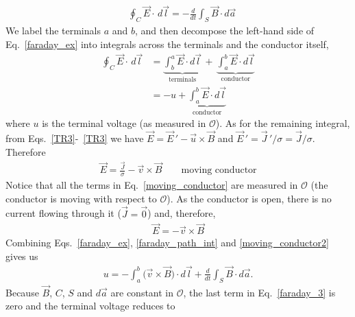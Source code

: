 \documentclass[11pt,a4paper,oneside]{book}
\numberwithin{equation}{section}
\theoremstyle{it}
\theoremstyle{definition}
\begin{document}
 \begin{equation}\label{faraday_ex}
 	\begin{aligned}
 		&\oint_C \vec{E}\cdot\,d\vec{l}=-\frac{d}{d t}\int_S\vec{B}\cdot d\vec{a}
 	\end{aligned}
 \end{equation} 
We label the terminals $a$ and $b$, and then decompose the left-hand side of Eq.~\eqref{faraday_ex} into integrals across the terminals and the conductor itself,
 \begin{equation}\label{faraday_path_int}
	\begin{aligned}
		\oint_C \vec{E}\cdot\,d\vec{l}&=\underbrace{\int_{b}^{a}\vec{E}\cdot d\vec{l}}_{\text{terminals}}\,+\,\underbrace{\int_{a}^{b}\vec{E}\cdot d\vec{l}}_{\text{conductor}} \\[8pt]
		&=-u+\underbrace{\int_{a}^{b}\vec{E}\cdot d\vec{l}}_{\text{conductor}}
	\end{aligned}
\end{equation}  
where $u$ is the terminal voltage (as measured in $\mathcal{O}$). As for the remaining integral, from Eqs.~\eqref{TR3}-~\ref{TR3} we have $\vec{E} = \vec{E}\,'-\vec{u}\times\vec{B}$ and $\vec{E}\,' = \vec{J}\,'/\sigma = \vec{J}/\sigma$. Therefore
 \begin{equation}\label{moving_conductor}
	\begin{aligned}
		\vec{E}=\frac{\vec{J}}{\sigma}-\vec{v}\times\vec{B}\qquad\text{moving conductor}
	\end{aligned}
\end{equation} 
Notice that all the terms in Eq.~\eqref{moving_conductor} are measured in $\mathcal{O}$ (the conductor is moving with respect to $\mathcal{O}$). As the conductor is open, there is no current flowing through it ($\vec{J}=\vec{0}$) and, therefore,
 \begin{equation}\label{moving_conductor2}
	\begin{aligned}
		\vec{E}=-\vec{v}\times\vec{B}
	\end{aligned}
\end{equation} 
Combining Eqs.~\eqref{faraday_ex}, \ref{faraday_path_int} and \ref{moving_conductor2} gives us
 \begin{equation}\label{faraday_3}
	\begin{aligned}
		u=-\int_{a}^{b}\big(\vec{v}\times\vec{B}\big)\cdot d\vec{l} + \frac{d}{d t}\int_S\vec{B}\cdot d\vec{a}.
	\end{aligned}
\end{equation} 
Because $\vec{B}$, $C$, $S$ and $d\vec{a}$ are constant in $\mathcal{O}$, the last term in Eq.~\eqref{faraday_3} is zero and the terminal voltage reduces to 
\end{document}
